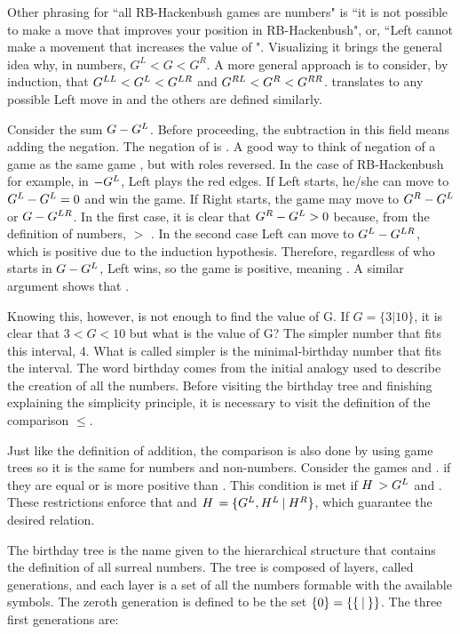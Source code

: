 Other phrasing for ``all RB-Hackenbush games are numbers" is ``it is not possible to make a move that improves your position in  RB-Hackenbush", or, ``Left cannot make a movement that increases the value of \Gm{}". Visualizing it brings the general idea why, in numbers, $G^L < G < G^R$. A more general approach is to consider, by induction, that $\mbox{$G^{LL}$} < \mbox{$G^L$} < \mbox{$G^{LR}$}$ and $\mbox{$G^{RL}$} < \mbox{$G^R$} < \mbox{$G^{RR}$}$.  translates to any possible Left move in  and the others are defined similarly.

Consider the sum $\mbox{$G$} - \mbox{$G^L$}$. Before proceeding, the subtraction in this field means adding the negation. The negation of  is . A good way to think of negation of a game \Gm{} as the same game \Gm{}, but with roles reversed. In the case of RB-Hackenbush for example, in ${-}\mbox{$G^L$}$, Left plays the red edges. If Left starts, he/she can move to $\mbox{$G^L$} - \mbox{$G^L$} = 0$ and win the game. If Right starts, the game may move to $\mbox{$G^R$} - \mbox{$G^L$}$ or $\mbox{$G$} - \mbox{$G^{LR}$}$. In the first case, it is clear that $\mbox{$G^R$} - \mbox{$G^L$} > 0$ because, from the definition of numbers,  $>$ .
In the second case Left can move to $\mbox{$G^L$} - \mbox{$G^{LR}$}$, which is positive due to the induction hypothesis. Therefore, regardless of who starts in $\mbox{$G$} - \mbox{$G^L$}$, Left wins, so the game is positive, meaning . A similar argument shows that .

Knowing this, however, is not enough to find the value of G. If $G = \{3 | 10\}$, it is clear that $3 < G < 10$ but what is the value of G? The simpler number that fits this interval, 4. What is called simpler is the minimal-birthday number that fits the interval. The word birthday comes from the initial analogy used to describe the creation of all the numbers. Before visiting the birthday tree and finishing explaining the simplicity principle, it is necessary to visit the definition of the comparison $\leq$.

Just like the definition of addition, the comparison is also done by using game trees so it is the same for numbers and non-numbers. Consider the games \Gm{} and \Hm. \Gm{\leq \Hm} if they are equal or \Hm is more positive than \Gm{}. This condition is met if $\mbox{$H\,$} > G^L$ and . These restrictions enforce that  and $\mbox{$H\,$} = \mbox{$\{G^L,H^L\:|\:H^R\}$}$, which guarantee the desired relation.

The birthday tree is the name given to the hierarchical structure that contains the definition of all surreal numbers. The tree is composed of layers, called generations, and each layer is a set of all the numbers formable with the available symbols. The zeroth generation is defined to be the set $\{0\} = \{\mbox{$\{\:|\:\}$}\}$. The three first generations are:

